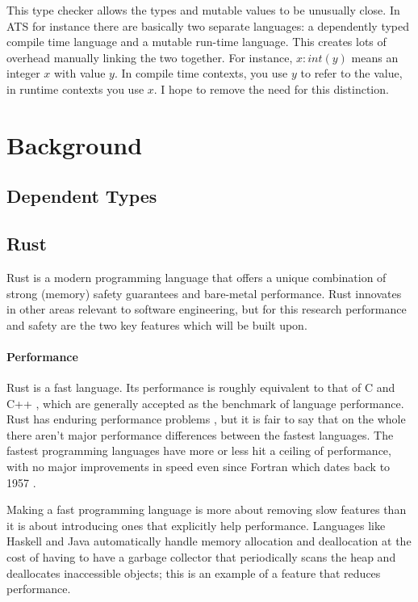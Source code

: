 \documentclass[12pt,twoside]{report}
\begin{document}
This type checker allows the types and mutable values to be unusually close. In ATS for instance there are basically two separate languages: a dependently typed compile time language and a mutable run-time language. This creates lots of overhead manually linking the two together. For instance, $x : int(y)$ means an integer $x$ with value $y$. In compile time contexts, you use $y$ to refer to the value, in runtime contexts you use $x$. I hope to remove the need for this distinction.

\chapter{Background}
\label{background}

\section{Dependent Types}

\section{Rust}
Rust is a modern programming language that offers a unique combination of strong (memory) safety guarantees and bare-metal performance. Rust innovates in other areas relevant to software engineering, but for this research performance and safety are the two key features which will be built upon.

\subsubsection{Performance}
Rust is a fast language. Its performance is roughly equivalent to that of C and C++ \cite{RustVsWhich}, which are generally accepted as the benchmark of language performance. Rust has enduring performance problems \cite{AreWeStackefficient2022}, but it is fair to say that on the whole there aren't major performance differences between the fastest languages. The fastest programming languages have more or less hit a ceiling of performance, with no major improvements in speed even since Fortran \cite{GccVsClassic} which dates back to 1957 \cite[p. 16]{wilsonComparativeProgrammingLanguages2001}.

Making a fast programming language is more about removing slow features than it is about introducing ones that explicitly help performance. Languages like Haskell and Java automatically handle memory allocation and deallocation at the cost of having to have a garbage collector that periodically scans the heap and deallocates inaccessible objects; this is an example of a feature that reduces performance.
\end{document}

